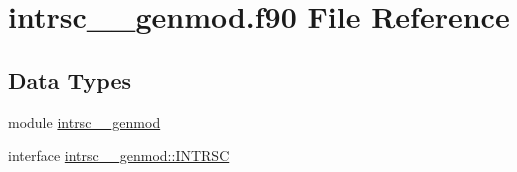 \hypertarget{intrsc____genmod_8f90}{\section{intrsc\+\_\+\+\_\+genmod.\+f90 File Reference}
\label{intrsc____genmod_8f90}
}
\subsection*{Data Types}
\begin{DoxyCompactItemize}
\item 
module \hyperlink{classintrsc____genmod}{intrsc\+\_\+\+\_\+genmod}
\item 
interface \hyperlink{interfaceintrsc____genmod_1_1INTRSC}{intrsc\+\_\+\+\_\+genmod\+::\+I\+N\+T\+R\+S\+C}
\end{DoxyCompactItemize}
